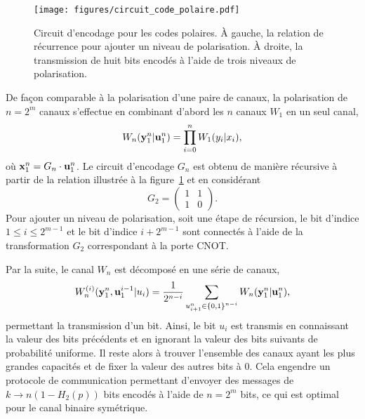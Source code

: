 \begin{figure}
  \begin{center}
    \texttt{[image: figures/circuit\_code\_polaire.pdf]}
  \end{center}
  \caption[Circuit des codes polaires]{
    Circuit d'encodage pour les codes polaires.
    À gauche, la relation de récurrence pour ajouter un niveau de polarisation.
    À droite, la transmission de huit bits encodés à l'aide de trois niveaux de polarisation.
  }
  \label{fig:circuit_code_polaire}
\end{figure}

De façon comparable à la polarisation d'une paire de canaux,
la polarisation de $n = 2^m$ canaux s'effectue en combinant
d'abord les $n$ canaux $W_1$ en un seul canal,
\begin{equation}
  W_n(\vb y_1^n | \vb u_1^n) = \prod_{i=0}^n W_1(y_i | x_i),
\end{equation}
où $\vb x_1^n = G_n \cdot \vb u_1^n$.
Le circuit d'encodage $G_n$ est obtenu de manière récursive à partir de la relation illustrée
à la figure~\ref{fig:circuit_code_polaire} et en considérant 
\begin{equation}
  G_2 = 
  \begin{pmatrix}
    1 & 1 \\
    1 & 0
  \end{pmatrix}.
\end{equation}
Pour ajouter un niveau de polarisation, 
soit une étape de récursion,
le bit d'indice $1 \leq i \leq 2^{m-1}$ et le bit 
d'indice $i + 2^{m-1}$ sont connectés à l'aide de la
transformation $G_2$ correspondant à la porte CNOT.

Par la suite,
le canal $W_n$ est décomposé en une série de canaux,
\begin{equation}
  W_n^{(i)}(\vb y_1^n, \vb u_1^{i - 1} | u_i) 
  = \frac{1}{2^{n - i}}
  \sum_{u_{i+1}^n \in \qty{0, 1}^{n - i}} W_n(\vb y_1^n | \vb u_1^n),
  \label{eq:canal_polarise}
\end{equation}
permettant la transmission d'un bit.
Ainsi, 
le bit $u_i$ est transmis en connaissant la valeur des bits précédents et en 
ignorant la valeur des bits suivants de probabilité uniforme.
Il reste alors à trouver l'ensemble des canaux ayant les plus grandes capacités
et de fixer la valeur des autres bits à 0.
Cela engendre un protocole de communication permettant d'envoyer des messages de
$k \to n(1 - H_2(p))$ bits encodés à l'aide de $n = 2^m$ bits, ce qui est optimal pour le 
canal binaire symétrique.

